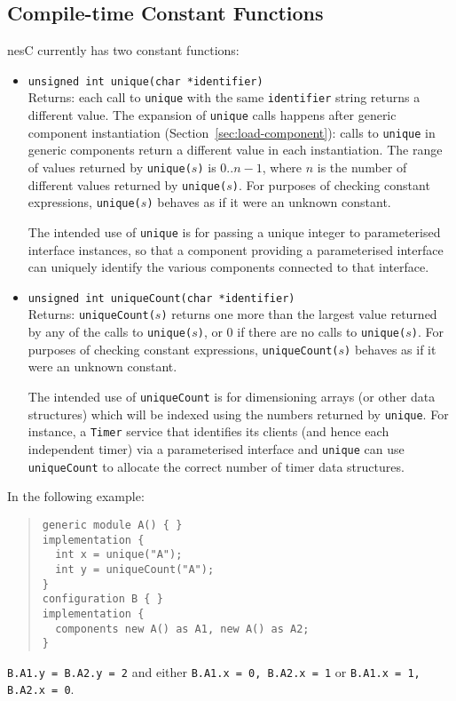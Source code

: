 \documentclass[11pt,letterpaper]{article}
\newcommand{\kw}[1]{{\tt #1}}
\newcommand{\code}[1]{{\tt #1}}
\newcommand{\nesc}{nesC\xspace}
\begin{document}
\subsection{Compile-time Constant Functions}
\label{sec:constant-functions}

\nesc currently has two constant functions:
\begin{itemize}
\item 
\code{unsigned int unique(char *identifier)} \\ Returns: each call to
\code{unique} with the same \code{identifier} string returns a different
value. The expansion of \code{unique} calls happens after generic component
instantiation (Section~\ref{sec:load-component}): calls to \code{unique} in
generic components return a different value in each instantiation. The
range of values returned by \code{unique($s$)} is $0 .. n-1$, where $n$ is
the number of different values returned by \code{unique($s$)}. For
purposes of checking constant expressions, \code{unique($s$)} behaves
as if it were an unknown constant.

The intended use of \code{unique} is for passing a unique integer
to parameterised interface instances, so that a component providing
a parameterised interface can uniquely identify the various components
connected to that interface.

\item \code{unsigned int uniqueCount(char *identifier)} \\ Returns:
\code{uniqueCount($s$)} returns one more than the largest value returned by
any of the calls to \code{unique($s$)}, or 0 if there are no calls to
\code{unique($s$)}. For purposes of checking constant expressions,
\code{uniqueCount($s$)} behaves as if it were an unknown constant.

The intended use of \code{uniqueCount} is for dimensioning arrays (or other
data structures) which will be indexed using the numbers returned by
\kw{unique}. For instance, a \kw{Timer} service that identifies its clients
(and hence each independent timer) via a parameterised interface and
\kw{unique} can use \kw{uniqueCount} to allocate the correct number of
timer data structures.

\end{itemize}

In the following example:
\begin{quote}
\begin{verbatim}
generic module A() { }
implementation {
  int x = unique("A");
  int y = uniqueCount("A");
}
configuration B { }
implementation {
  components new A() as A1, new A() as A2;
}
\end{verbatim}
\end{quote}
\code{B.A1.y = B.A2.y = 2} and either \code{B.A1.x = 0, B.A2.x = 1} or
\code{B.A1.x = 1, B.A2.x = 0}.
\end{document}
